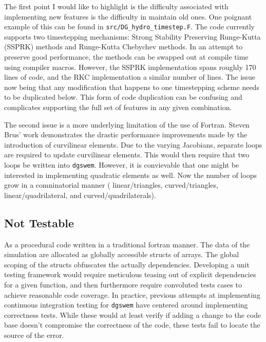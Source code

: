 The first point I would like to highlight is the difficulty associated with implementing new features is the difficulty in maintain old ones. One poignant example of this can be found in \texttt{src/DG\_hydro\_timestep.F}. The code currently supports two timestepping mechanisms: Strong Stability Preserving Runge-Kutta (SSPRK) methods and Runge-Kutta Chebychev methods. In an attempt to preserve good performance, the methods can be swapped out at compile time using compiler macros. However, the SSPRK implementation spans roughly 170 lines of code, and the RKC implementation a similar number of lines. The issue now being that any modification that happens to one timestepping scheme needs to be duplicated below. This form of code duplication can be confusing and complicates supporting the full set of features in any given combination.

The second issue is a more underlying limitation of the use of Fortran. Steven Brus' work \cite{brusDiss} demonstrates the drastic performance improvements made by the introduction of curvilinear elements. Due to the varying Jacobians, separate loops are required to update curvilinear elements. This would then require that two loops be written into \texttt{dgswem}. However, it is convievable that one might be interested in implementing quadratic elements as well. Now the number of loops grow in a comninatorial manner ( linear/triangles, curved/triangles, linear/quadrilateral, and curved/quadrilaterals).



\subsection{Not Testable}
As a procedural code written in a traditional fortran manner. The data of the simulation are allocated as globally accessible structs of arrays. The global scoping of the structs obfuscates the actually dependencies. Developing a unit testing framework would require meticulous teasing out of explicit dependencies for a given function, and then furthermore require convoluted tests cases to achieve reasonable code coverage. In practice, previous attempts at implementing continuous integration testing for \texttt{dgswem} have centered around implementing correctness tests. While these would at least verify if adding a change to the code base doesn't compromise the correctness of the code, these tests fail to locate the source of the error. 


